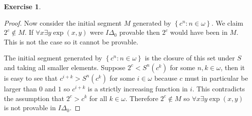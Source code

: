\documentclass{article}
\newcommand{\setwith}[2]{\left\{#1:#2\right\}}
\theoremstyle{definition}
\newtheorem{question}{Exercise}
\begin{document}
\begin{question}
\begin{enumerate}[(a)]
\begin{proof}
                  Now consider the initial segment \(M\) generated by
                  \(\setwith{c^{n}}{n\in\omega}\). We claim \(2^{c}\notin M\).
                  If \(\forall x\exists y\exp(x,y)\) were \(I\Delta_{0}\)
                  provable then \(2^{c}\) would have been in \(M\). This is not
                  the case so it cannot be provable.

                  The initial segment generated by
                  \(\setwith{c^{n}}{n\in\omega}\) is the closure of this set
                  under \(S\) and taking all smaller elements. Suppose
                  \(2^{c}<S^{n}(c^{k})\) for some \(n,k\in\omega\), then it is
                  easy to see that \(c^{i+k}>S^{n}(c^{k})\) for some
                  \(i\in\omega\) because \(c\) must in particular be larger than
                  \(0\) and \(1\) so \(c^{i+k}\) is a strictly increasing
                  function in \(i\). This contradicts the assumption that
                  \(2^{c}>c^{k}\) for all \(k\in\omega\). Therefore
                  \(2^{c}\notin M\) so \(\forall x\exists y\exp(x,y)\) is not
                  provable in \(I\Delta_{0}\).
              \end{proof}
    \end{enumerate}
\end{question}
\end{document}
